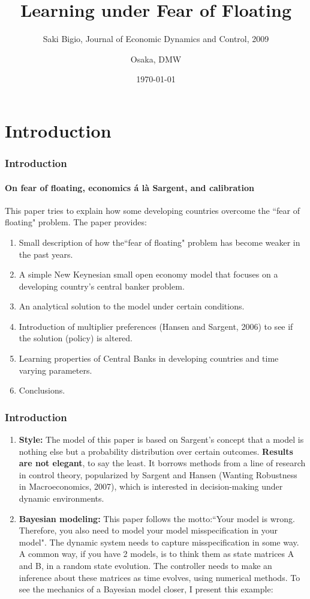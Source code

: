 \documentclass{beamer}
\title{Learning under Fear of Floating}
\author{Osaka, DMW}
\subtitle{Saki Bigio, Journal of Economic Dynamics and Control, 2009}
\date{\today}
\begin{document}
\frame{\titlepage}
\section[Outline]{}
\frame{\tableofcontents}
\section{Introduction}
\begin{frame} 
\frametitle{Introduction} 
\framesubtitle{On fear of floating, economics \'{a} l\`{a} Sargent, and calibration} 
This paper tries to explain how some developing countries overcome the ``fear of
floating" problem. 
The paper provides:
\begin{enumerate} 
\item Small description of how the``fear of floating" problem has become weaker
in the past years.
\item A simple New Keynesian small open economy model that focuses on a
developing country's central banker problem.
\item An analytical solution to the model under certain conditions.
\item Introduction of multiplier preferences (Hansen and Sargent, 2006) to see if the solution (policy) is
altered.
\item Learning properties of Central Banks in developing countries and time
varying parameters.
\item Conclusions.
\end{enumerate} 
\end{frame}

\begin{frame} 
\frametitle{Introduction} 
\begin{enumerate} 
\item \textbf{Style:} The model of this paper is based on Sargent's concept that a
model is nothing else but a probability distribution over certain outcomes.
\textbf{Results are not elegant}, to say the least. It borrows methods from a 
line of research in control theory, popularized by Sargent and Hansen (Wanting Robustness in Macroeconomics, 2007),
which is interested in decision-making under dynamic environments.
 \item \textbf{Bayesian modeling:} This paper follows the motto:``Your model is wrong. Therefore, you also need to model your model
 misspecification in your model". The dynamic system needs to capture
 misspecification in some way. A common way, if you have 2 models, is to think
 them as state matrices A and B,  in a random state evolution. The controller
 needs to make an inference about these matrices as time evolves, using numerical
methods. To see the mechanics of a Bayesian model closer, I present this
example:
 \end{enumerate}
 \end{frame}
 
\end{document}
